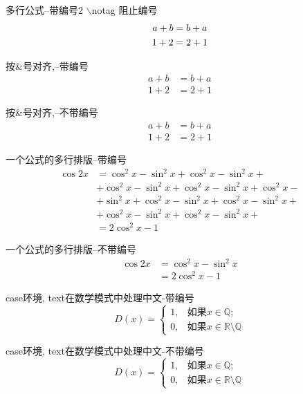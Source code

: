 \documentclass[UTF8]{ctexart}
\begin{document}
多行公式--带编号2 $\backslash$notag 阻止编号
\begin{gather}
a + b = b + a \notag \\
1+2 = 2 + 1 \notag
\end{gather}

按\&号对齐,--带编号
\begin{align}
a+b &= b+a \\
1+2 &=  2+1
\end{align}

按\&号对齐,--不带编号
\begin{align*}
a+b &= b+a \\
1+2 &=2+1
\end{align*}

一个公式的多行排版--带编号
\begin{equation}
\begin{split}
\cos 2x &= \cos^2 x - \sin^2x + \cos^2 x - \sin^2x + \\
&+  \cos^2 x - \sin^2x + \cos^2 x - \sin^2x + \cos^2 x - \\
&+  \sin^2x + \cos^2 x - \sin^2x + \cos^2 x - \sin^2x + \\
&+  \cos^2 x - \sin^2x + \cos^2 x - \sin^2x + \\
&=2\cos^2x-1
\end{split} 
\end{equation}

一个公式的多行排版--不带编号
\begin{equation*}
\begin{split}
\cos 2x &= \cos^2 x - \sin^2x \\
&=2\cos^2x-1
\end{split} 
\end{equation*}

case环境, text{}在数学模式中处理中文-带编号
\begin{equation}
D(x)=\begin{cases}
1, & \text{如果} x \in \mathbb{Q};\\
0, & \text{如果} x \in \mathbb{R}\setminus\mathbb{Q}
\end{cases}
\end{equation}

case环境, text{}在数学模式中处理中文-不带编号
\begin{equation*}
D(x)=\begin{cases}
1, & \text{如果} x \in \mathbb{Q};\\
0, & \text{如果} x \in \mathbb{R}\setminus\mathbb{Q}
\end{cases}
\end{equation*}
\end{document}
